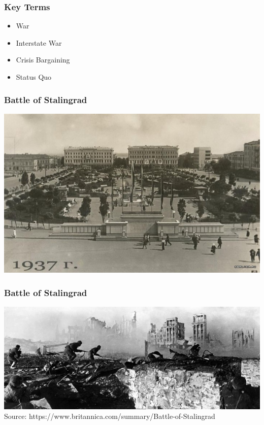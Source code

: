 \documentclass{beamer}
\begin{document}
\begin{frame} 
	\frametitle{\LARGE{Key Terms}}
	\begin{itemize}
		\item War 
		\item Interstate War
		\item Crisis Bargaining
		\item Status Quo
	\end{itemize}
\end{frame}

\begin{frame} 
	\frametitle{\LARGE{Battle of Stalingrad}}	
	\centering
	\includegraphics[width=\textwidth,height=0.85\textheight,keepaspectratio]{Stalingradpre.jpg}
\end{frame}

\begin{frame} 
	\frametitle{\LARGE{Battle of Stalingrad}}	
	\centering
	\includegraphics[width=\textwidth,height=0.9\textheight,keepaspectratio]{Stalingrad.jpg}
	\tiny Source:  https://www.britannica.com/summary/Battle-of-Stalingrad
\end{frame}
\end{document}
